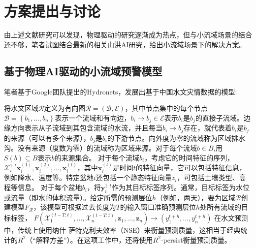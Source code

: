 \documentclass{ctexart}
\begin{document}
\section{方案提出与讨论}

由上述文献研究可以发现，物理驱动的研究逐渐成为热点，但与小流域场景的结合还不够，笔者试图结合最新的相关山洪AI研究，给出小流域场景下的解决方案。

\subsection{基于物理AI驱动的小流域预警模型}

笔者基于Google团队提出的Hydronets\cite{moshe2020hydronets}，发展出基于中国水文灾情数据的模型:

将水文区域$\mathcal{R}$定义为有向图$\mathcal{R}=(\mathcal{B}, \mathcal{E})$，其中节点集中的每个节点$\mathcal{B}=\left\{b_{1}, \ldots, b_{n}\right\}$表示一个流域和有向边，$b_{i} \rightarrow b_{j} \in \mathcal{E}$表示$b_{i}$是$b_{j}$的直接子流域。边缘方向表示从子流域到其包含流域的水流，并且每当$b_{i} \rightarrow b_{j}$存在，就代表着$b_{i}$是$b_{j}$的来源（可以有多个来源），$b_{j}$是$b_{i}$的下游节点。向外度为零的流域称为区域排水沟。没有来源（度数为零）的流域称为区域来源。对于每个流域$b \in B$,用$S(b) \subseteq B$表示$b$的来源集合。
对于每个流域$b_{i}$，考虑它的时间特征的序列，$\mathcal{X}_{i}^{1: t} \mathbf{x}_{i}^{(1)}, \mathbf{x}_{i}^{(2)}, \ldots, \mathbf{x}_{i}^{(t)}$，其中$\mathbf{x}_{i}^{(t)}$是时间$t$的特征向量，它可以包括特征信息，例如降水、温度等。特定盆地$i$还包括一个静态特征向量$z_{i}$，可包括土壤类型、高程等信息。
对于每个盆地$b_{i}$，将$\mathbf{y}_{i}^{1: t}$作为其目标标签序列。通常，目标标签为水位或流量（即水的体积流量）。给定所需的预测层位$h$（例如，两天），要为区域$\mathcal{R}$创建模型$F_{\mathcal{R}}$，该模型可根据过去长度为$T$的输入窗口准确预测层位$h$处所有流域的目标标签，
$F\left(\mathcal{X}_{1}^{(t-T: t)}, \ldots, \mathcal{X}_{n}^{(t-T: t)}, \mathbf{z}_{1}, \ldots, \mathbf{z}_{n}\right) \rightarrow\left(y_{1}^{t+h}, \ldots, y_{n}^{t+h}\right)$
在水文预测中，传统上使用纳什-萨特克利夫效率（NSE）来衡量预测质量，这相当于经典统计的$R^{2}$（“解释方差”）。在这项工作中，还将使用$R^{2}$-persist衡量预测质量。
\end{document}
